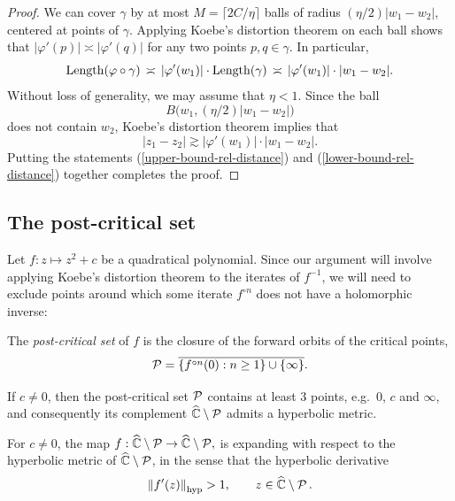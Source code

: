 \begin{proof}
We can cover $\gamma$ by at most $M = \lceil 2C/\eta \rceil$ balls of radius $(\eta/2)|w_1-w_2|$, centered at points of $\gamma$.
Applying Koebe's distortion theorem on each ball shows that
$|\varphi'(p)| \asymp |\varphi'(q)|$ for any two points $p, q \in \gamma$. In particular,
\begin{equation}
\label{upper-bound-rel-distance}
\operatorname{Length}(\varphi \circ \gamma) \, \asymp \, |\varphi'(w_1)| \cdot \operatorname{Length}(\gamma) \, \asymp \, |\varphi'(w_1)| \cdot |w_1 - w_2|.
\end{equation}
Without loss of generality, we may assume that $\eta < 1$. Since the ball $$B \bigl (w_1, (\eta/2) |w_1 - w_2| \bigr )$$ does not contain $w_2$, Koebe's distortion theorem implies that
\begin{equation}
\label{lower-bound-rel-distance}
|z_1-z_2| \gtrsim |\varphi'(w_1)| \cdot |w_1 - w_2|.
\end{equation}
Putting the statements (\ref{upper-bound-rel-distance}) and (\ref{lower-bound-rel-distance}) together completes the proof.
\end{proof}


\subsection{The post-critical set}

Let $f: z\mapsto z^2+c$ be a quadratical polynomial. 
Since our argument will involve applying Koebe's distortion theorem to the iterates of $f^{-1}$, 
we will need to exclude points around which some iterate $f^{\circ n}$ does not have a holomorphic inverse:

\begin{definition}
	The \emph{post-critical set} of $f$ is the closure of the forward orbits 
	of the critical points,
	\begin{equation*}
		\operatorname{\mathcal P} = \overline{\{f^{\circ n} (0): n \geq 1\} \cup \{\infty\}}.
	\end{equation*}	
\end{definition}

If $c \neq 0$, then the post-critical set $\operatorname{\mathcal P}$ contains at least $3$ points, e.g.~$0$, $c$ and $\infty$, and consequently its complement $\widehat{\mathbb C} \setminus \operatorname{\mathcal P}$
admits a hyperbolic metric.

 \begin{theorem}\label{theorem:hyperbolic_expanding}
For $c \neq 0$, the map
$f: \widehat {\mathbb C} \setminus \operatorname{\mathcal P} \to \widehat {\mathbb C} \setminus \operatorname{\mathcal P},$
is expanding with respect to the hyperbolic metric of $\widehat {\mathbb C} \setminus \operatorname{\mathcal P}$, in the sense that the hyperbolic derivative
\begin{equation}\label{eq:hyp-derivative-bound}
	\left\Vert f'(z)\right\Vert_{\operatorname{hyp}} > 1, \qquad z\in \widehat {\mathbb C} \setminus \operatorname{\mathcal P}.
\end{equation}
 \end{theorem}
 
